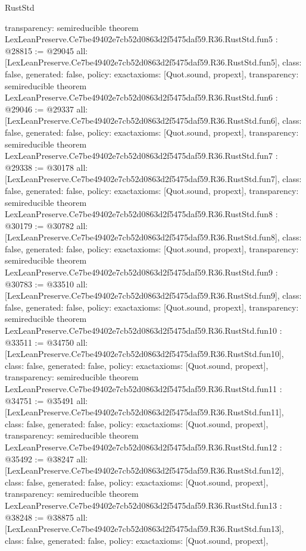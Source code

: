 \begin{lexlean}{RustStd}
\begin{coremodule}
{  transparency: semireducible
}
theorem LexLeanPreserve.Ce7be49402e7cb52d0863d2f5475daf59.R36.RustStd.fun5 : @28815 := @29045 {
  all: [LexLeanPreserve.Ce7be49402e7cb52d0863d2f5475daf59.R36.RustStd.fun5],
  class: false,
  generated: false,
  policy: exact{axioms: [Quot.sound, propext]},
  transparency: semireducible
}
theorem LexLeanPreserve.Ce7be49402e7cb52d0863d2f5475daf59.R36.RustStd.fun6 : @29046 := @29337 {
  all: [LexLeanPreserve.Ce7be49402e7cb52d0863d2f5475daf59.R36.RustStd.fun6],
  class: false,
  generated: false,
  policy: exact{axioms: [Quot.sound, propext]},
  transparency: semireducible
}
theorem LexLeanPreserve.Ce7be49402e7cb52d0863d2f5475daf59.R36.RustStd.fun7 : @29338 := @30178 {
  all: [LexLeanPreserve.Ce7be49402e7cb52d0863d2f5475daf59.R36.RustStd.fun7],
  class: false,
  generated: false,
  policy: exact{axioms: [Quot.sound, propext]},
  transparency: semireducible
}
theorem LexLeanPreserve.Ce7be49402e7cb52d0863d2f5475daf59.R36.RustStd.fun8 : @30179 := @30782 {
  all: [LexLeanPreserve.Ce7be49402e7cb52d0863d2f5475daf59.R36.RustStd.fun8],
  class: false,
  generated: false,
  policy: exact{axioms: [Quot.sound, propext]},
  transparency: semireducible
}
theorem LexLeanPreserve.Ce7be49402e7cb52d0863d2f5475daf59.R36.RustStd.fun9 : @30783 := @33510 {
  all: [LexLeanPreserve.Ce7be49402e7cb52d0863d2f5475daf59.R36.RustStd.fun9],
  class: false,
  generated: false,
  policy: exact{axioms: [Quot.sound, propext]},
  transparency: semireducible
}
theorem LexLeanPreserve.Ce7be49402e7cb52d0863d2f5475daf59.R36.RustStd.fun10 : @33511 := @34750 {
  all: [LexLeanPreserve.Ce7be49402e7cb52d0863d2f5475daf59.R36.RustStd.fun10],
  class: false,
  generated: false,
  policy: exact{axioms: [Quot.sound, propext]},
  transparency: semireducible
}
theorem LexLeanPreserve.Ce7be49402e7cb52d0863d2f5475daf59.R36.RustStd.fun11 : @34751 := @35491 {
  all: [LexLeanPreserve.Ce7be49402e7cb52d0863d2f5475daf59.R36.RustStd.fun11],
  class: false,
  generated: false,
  policy: exact{axioms: [Quot.sound, propext]},
  transparency: semireducible
}
theorem LexLeanPreserve.Ce7be49402e7cb52d0863d2f5475daf59.R36.RustStd.fun12 : @35492 := @38247 {
  all: [LexLeanPreserve.Ce7be49402e7cb52d0863d2f5475daf59.R36.RustStd.fun12],
  class: false,
  generated: false,
  policy: exact{axioms: [Quot.sound, propext]},
  transparency: semireducible
}
theorem LexLeanPreserve.Ce7be49402e7cb52d0863d2f5475daf59.R36.RustStd.fun13 : @38248 := @38875 {
  all: [LexLeanPreserve.Ce7be49402e7cb52d0863d2f5475daf59.R36.RustStd.fun13],
  class: false,
  generated: false,
  policy: exact{axioms: [Quot.sound, propext]},
}
\end{coremodule}
\end{lexlean}
